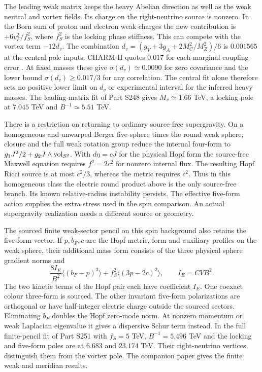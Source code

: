\documentclass[aps,prd,reprint,onecolumn,nofootinbib,amsmath,amssymb]{revtex4-2}
\begin{document}
The leading weak matrix keeps the heavy Abelian direction as well as the weak neutral and vortex fields. Its charge on the right-neutrino source is nonzero. In the Born sum of proton and electron weak charges the new contribution is $+6v_F^2/f_S^2$, where $f_S^2$ is the locking phase stiffness. This can compete with the vortex term $-12d_v$. The combination $d_v=(g_V+3g_A+2M_C^2/M_Z^2)/6$ is $0.001565$ at the central pole inputs. CHARM II quotes $0.017$ for each marginal coupling error \cite{CHARMII1994}. At fixed masses these give $\sigma(d_v)\simeq0.0090$ for zero covariance and the lower bound $\sigma(d_v)\ge0.017/3$ for any correlation. The central fit alone therefore sets no positive lower limit on $d_v$ or experimental interval for the inferred heavy masses. The leading-matrix fit of Part S248 gives $M_v\simeq1.66$ TeV, a locking pole at $7.045$ TeV and $B^{-1}\simeq5.51$ TeV.

There is a restriction on returning to ordinary source-free supergravity. On a homogeneous and unwarped Berger five-sphere times the round weak sphere, closure and the full weak rotation group reduce the internal four-form to $g_1 J^2/2+g_2J\wedge{\rm vol}_{S^2}$. With $d\eta=cJ$ for the physical Hopf form the source-free Maxwell equation requires $f^2=2c^2$ for nonzero internal flux. The resulting Hopf Ricci source is at most $c^2/3$, whereas the metric requires $c^2$. Thus in this homogeneous class the electric round product above is the only source-free branch. Its known relative-radius instability persists. The effective five-form action supplies the extra stress used in the spin comparison. An actual supergravity realization needs a different source or geometry.

The sourced finite weak-sector pencil on this spin background also retains the five-form vector. If $p,b_F,c$ are the Hopf metric, form and auxiliary profiles on the weak sphere, their additional mass form consists of the three physical sphere gradient norms and
\begin{equation}
 \frac{8I_E}{B^2}\langle(b_F-p)^2\rangle+
      f_S^2\langle(3p-2c)^2\rangle,\qquad I_E=CVB^2.
\end{equation}
The two kinetic terms of the Hopf pair each have coefficient $I_E$. One coexact colour three-form is sourced. The other invariant five-form polarizations are orthogonal or have half-integer electric charge outside the sourced sectors. Eliminating $b_F$ doubles the Hopf zero-mode norm. At nonzero momentum or weak Laplacian eigenvalue it gives a dispersive Schur term instead. In the full finite-pencil fit of Part S251 with $f_S=5$ TeV, $B^{-1}=5.496$ TeV and the locking and five-form poles are at $6.683$ and $23.174$ TeV. Their right-neutrino vertices distinguish them from the vortex pole. The companion paper gives the finite weak and meridian results.
\end{document}

